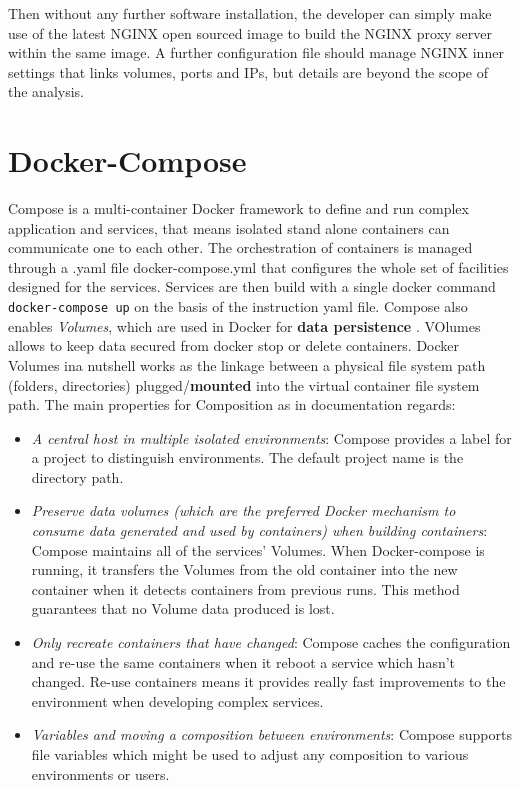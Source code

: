 \documentclass[
  12pt,
  a4paper,
  oneside]{book}
\newcommand{\passthrough}[1]{#1}
\providecommand{\tightlist}{%
  \setlength{\itemsep}{0pt}\setlength{\parskip}{0pt}}
\theoremstyle{definition}
\theoremstyle{definition}
\theoremstyle{definition}
\theoremstyle{remark}
\begin{document}
Then without any further software installation, the developer can simply make use of the latest NGINX open sourced image to build the NGINX proxy server within the same image. A further configuration file should manage NGINX inner settings that links volumes, ports and IPs, but details are beyond the scope of the analysis.

\hypertarget{docker-compose}{%
\section{Docker-Compose}\label{docker-compose}}

Compose is a multi-container Docker framework to define and run complex application and services, that means isolated stand alone containers can communicate one to each other. The orchestration of containers is managed through a .yaml file docker-compose.yml that configures the whole set of facilities designed for the services. Services are then build with a single docker command \passthrough{\lstinline!docker-compose up!} on the basis of the instruction yaml file. Compose also enables \emph{Volumes}, which are used in Docker for \textbf{data persistence} \citep{dockervolumes}. VOlumes allows to keep data secured from docker stop or delete containers. Docker Volumes ina nutshell works as the linkage between a physical file system path (folders, directories) plugged/\textbf{mounted} into the virtual container file system path.
The main properties for Composition as in documentation \citep{docker_documentation_2020} regards:

\begin{itemize}
\tightlist
\item
  \emph{A central host in multiple isolated environments}: Compose provides a label for a project to distinguish environments. The default project name is the directory path.
\item
  \emph{Preserve data volumes (which are the preferred Docker mechanism to consume data generated and used by containers) when building containers}: Compose maintains all of the services' Volumes. When Docker-compose is running, it transfers the Volumes from the old container into the new container when it detects containers from previous runs. This method guarantees that no Volume data produced is lost.
\item
  \emph{Only recreate containers that have changed}: Compose caches the configuration and re-use the same containers when it reboot a service which hasn't changed. Re-use containers means it provides really fast improvements to the environment when developing complex services.
\item
  \emph{Variables and moving a composition between environments}: Compose supports file variables which might be used to adjust any composition to various environments or users.
\end{itemize}
\end{document}
